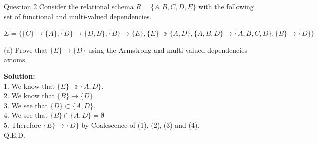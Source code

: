 \begin{frame}[fragile]{Question 2}
Consider the relational schema $R = \{A,B,C,D,E\}$ with the following set of functional and multi-valued dependencies.\\ \vspace{5pt}

$\Sigma=\{\{C\}\rightarrow\{A\}, \{D\}\rightarrow\{D,B\}, \{B\}\rightarrow\{E\},\{E\}\twoheadrightarrow\{A,D\},\{A,B,D\}\rightarrow\{A,B,C,D\},\{B\}\rightarrow\{D\}\}$\\ \vspace{5pt}

(a) Prove that $\{E\}\rightarrow\{D\}$ using the Armstrong and multi-valued dependencies axioms.\\ \vspace{5pt}

\textbf{Solution:}\\ \vspace{5pt}
1. We know that $\{E\}\twoheadrightarrow\{A,D\}$.\\ \vspace{2pt}
2. We know that $\{B\}\rightarrow\{D\}$.\\\vspace{2pt}
3. We see that $\{D\}\subset\{A,D\}$.\\\vspace{2pt}
4. We see that $\{B\}\cap \{A,D\}=\emptyset$\\\vspace{2pt}
5. Therefore $\{E\}\rightarrow\{D\}$ by Coalescence of (1), (2), (3) and (4).\\\vspace{2pt}
Q.E.D.
\end{frame}

